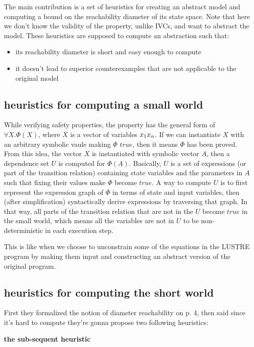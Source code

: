 The  main contribution is  a  set  of  heuristics  for  creating  an
abstract model and computing a bound on the reachability
diameter of its state space. 
Note that here we don't know the validity of the property, unlike IVCs, and want to
 abstract the model. These heuristics are supposed to compute an abstraction such that:
\begin{itemize}
  \item its reachability diameter is short and easy enough to compute
  \item it doesn't lead to superior counterexamples that are not applicable to the original model
\end{itemize}

\subsection{heuristics for computing a small world}
While verifying safety properties, the property has the general form of $\forall X. \Phi (X)$, where $X$ is a vector of variables $x_1 \dotfill x_n$. If we can 
instantiate $X$ with an arbitrary symbolic vaule making $\Phi$ $true$, then it means $\Phi$ has been proved. 
From this idea, the vector $X$ is instantiated with symbolic vector $A$, then 
a dependence set $U$ is computed for $\Phi (A)$. Basically, $U$ is a set of expressions 
(or part of the transition relation) containing state variables and the parameters in $A$ such that 
fixing their values make $\Phi$ become $true$. A way to compute $U$ is to first represent 
the expression graph of $\Phi$ in terms of state and input variables, then (after simplification) syntactically derive expressions  
by traversing that graph. In that way, all parts of the transition relation that are not in the $U$ 
become $true$ in the small world, which means all the variables are not in $U$ to be non-deterministic in each execution step. 

This is like when we choose to unconstrain some of the equations in the LUSTRE program by making them input and constructing an abstract version of the original program.

\subsection{heuristics for computing the short world}
First they formalized the notion of diameter reachability on p. 4, then said since it's hard to compute 
they're gonna propose two following heuristics:

\textbf{the sub-sequent heuristic} 


